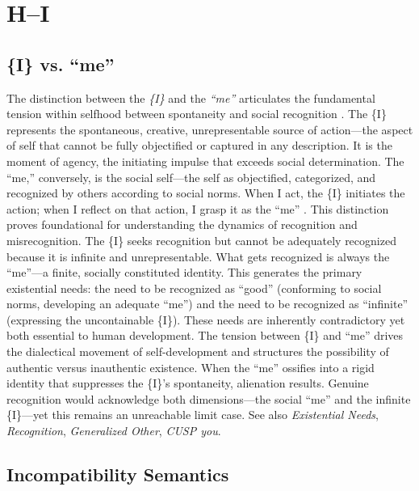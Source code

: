 \documentclass{book}
\begin{document}
\chapter{H--I}

\section{\{I\} vs. ``me''}

The distinction between the \textit{\{I\}} and the \textit{``me''} articulates the fundamental tension within selfhood between spontaneity and social recognition \parencite{mead1934social}. The \{I\} represents the spontaneous, creative, unrepresentable source of action---the aspect of self that cannot be fully objectified or captured in any description. It is the moment of agency, the initiating impulse that exceeds social determination. The ``me,'' conversely, is the social self---the self as objectified, categorized, and recognized by others according to social norms. When I act, the \{I\} initiates the action; when I reflect on that action, I grasp it as the ``me'' \parencite{mead1934social}. This distinction proves foundational for understanding the dynamics of recognition and misrecognition. The \{I\} seeks recognition but cannot be adequately recognized because it is infinite and unrepresentable. What gets recognized is always the ``me''---a finite, socially constituted identity. This generates the primary existential needs: the need to be recognized as ``good'' (conforming to social norms, developing an adequate ``me'') and the need to be recognized as ``infinite'' (expressing the uncontainable \{I\}). These needs are inherently contradictory yet both essential to human development. The tension between \{I\} and ``me'' drives the dialectical movement of self-development and structures the possibility of authentic versus inauthentic existence. When the ``me'' ossifies into a rigid identity that suppresses the \{I\}'s spontaneity, alienation results. Genuine recognition would acknowledge both dimensions---the social ``me'' and the infinite \{I\}---yet this remains an unreachable limit case. See also \textit{Existential Needs}, \textit{Recognition}, \textit{Generalized Other}, \textit{CUSP you}.

\section{Incompatibility Semantics}
\end{document}
